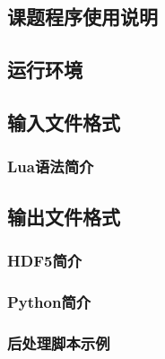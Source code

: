 \documentclass[master,xetex]{thuthesis}
\begin{document}
\begin{appendix}

\chapter{课题程序使用说明}
\section{运行环境}
\section{输入文件格式}
\subsection{Lua语法简介}
\section{输出文件格式}
\subsection{HDF5简介}
\subsection{Python简介}
\subsection{后处理脚本示例}

%

%
%
\end{appendix}

%
\end{document}
